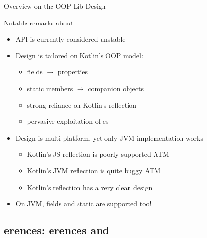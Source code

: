 \documentclass[handout]{beamer}
\begin{document}
\begin{frame}[allowframebreaks]{Overview on the OOP Lib Design}
    \begin{alertblock}{Notable remarks about }
        \begin{itemize}
            \item API is currently considered unstable
            \item Design is tailored on Kotlin's OOP model:
            \begin{itemize}
                \item fields $\rightarrow$ properties
                \item static members $\rightarrow$ companion objects
                \item strong reliance on Kotlin's reflection
                \item pervasive exploitation of es
            \end{itemize}
            \item Design is multi-platform, yet only JVM implementation works
            \begin{itemize}
                \item Kotlin's JS reflection is poorly supported ATM
                \item Kotlin's JVM reflection is quite buggy ATM 
                \item Kotlin's reflection has a very clean design
            \end{itemize}
            \item On JVM, fields and static are supported too!
        \end{itemize}
    \end{alertblock}






\end{frame}

\subsection{erences: erences and }
\end{document}
